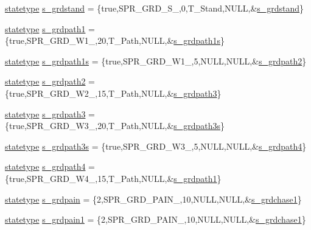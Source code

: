 \begin{DoxyCompactItemize}
\item 
\hyperlink{structstatestruct}{statetype} \hyperlink{WL__ACT2_8C_a919f07f4c0f399e351387cc6a7987554}{s\_\-grdstand} = \{true,SPR\_\-GRD\_\-S\_,0,T\_\-Stand,NULL,\&\hyperlink{WL__ACT2_8C_a919f07f4c0f399e351387cc6a7987554}{s\_\-grdstand}\}
\item 
\hyperlink{structstatestruct}{statetype} \hyperlink{WL__ACT2_8C_a87bf01f7bc4f9914738de5504d6606d7}{s\_\-grdpath1} = \{true,SPR\_\-GRD\_\-W1\_,20,T\_\-Path,NULL,\&\hyperlink{WL__ACT2_8C_a5dbefbb7de0eb1b52d107e5ea95f3746}{s\_\-grdpath1s}\}
\item 
\hyperlink{structstatestruct}{statetype} \hyperlink{WL__ACT2_8C_a5dbefbb7de0eb1b52d107e5ea95f3746}{s\_\-grdpath1s} = \{true,SPR\_\-GRD\_\-W1\_,5,NULL,NULL,\&\hyperlink{WL__ACT2_8C_a35f7cee7d93affd65e4a22852cad2787}{s\_\-grdpath2}\}
\item 
\hyperlink{structstatestruct}{statetype} \hyperlink{WL__ACT2_8C_a35f7cee7d93affd65e4a22852cad2787}{s\_\-grdpath2} = \{true,SPR\_\-GRD\_\-W2\_,15,T\_\-Path,NULL,\&\hyperlink{WL__ACT2_8C_a7a25d80583843555aa0f656420dc0449}{s\_\-grdpath3}\}
\item 
\hyperlink{structstatestruct}{statetype} \hyperlink{WL__ACT2_8C_a7a25d80583843555aa0f656420dc0449}{s\_\-grdpath3} = \{true,SPR\_\-GRD\_\-W3\_,20,T\_\-Path,NULL,\&\hyperlink{WL__ACT2_8C_ae062aa8aa55b457c49c9c80da5c3c3cb}{s\_\-grdpath3s}\}
\item 
\hyperlink{structstatestruct}{statetype} \hyperlink{WL__ACT2_8C_ae062aa8aa55b457c49c9c80da5c3c3cb}{s\_\-grdpath3s} = \{true,SPR\_\-GRD\_\-W3\_,5,NULL,NULL,\&\hyperlink{WL__ACT2_8C_aa9d66e67ff04606e339fc6a2b55d996b}{s\_\-grdpath4}\}
\item 
\hyperlink{structstatestruct}{statetype} \hyperlink{WL__ACT2_8C_aa9d66e67ff04606e339fc6a2b55d996b}{s\_\-grdpath4} = \{true,SPR\_\-GRD\_\-W4\_,15,T\_\-Path,NULL,\&\hyperlink{WL__ACT2_8C_a87bf01f7bc4f9914738de5504d6606d7}{s\_\-grdpath1}\}
\item 
\hyperlink{structstatestruct}{statetype} \hyperlink{WL__ACT2_8C_a97e65436bab06912e56ddec59ee73a3e}{s\_\-grdpain} = \{2,SPR\_\-GRD\_\-PAIN\_,10,NULL,NULL,\&\hyperlink{WL__DEF_8H_a1d9f3438111fc0b2e57f2c72d5e8aa42}{s\_\-grdchase1}\}
\item 
\hyperlink{structstatestruct}{statetype} \hyperlink{WL__ACT2_8C_a8e29ce2b8a415ba47460c294eda3b480}{s\_\-grdpain1} = \{2,SPR\_\-GRD\_\-PAIN\_,10,NULL,NULL,\&\hyperlink{WL__DEF_8H_a1d9f3438111fc0b2e57f2c72d5e8aa42}{s\_\-grdchase1}\}
\item 

\end{DoxyCompactItemize}
